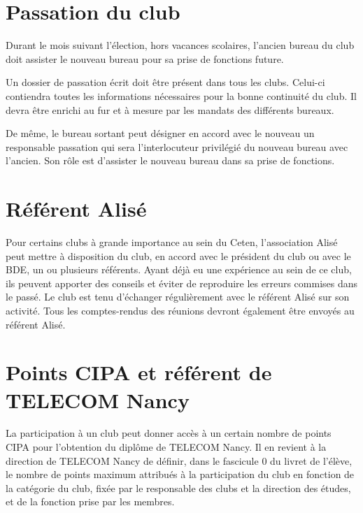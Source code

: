 \documentclass{article}
\begin{document}
\begin{multicols}{2}
		\section{Passation du club}
\label{sec:passation_du_club}

		{\small

			Durant le mois suivant l’élection, hors vacances scolaires, l’ancien
			bureau du club doit assister le nouveau bureau pour sa prise de
			fonctions future.

			Un dossier de passation écrit doit être présent dans tous les clubs.
			Celui-ci contiendra toutes les informations nécessaires pour la
			bonne continuité du club. Il devra être enrichi au fur et à mesure
			par les mandats des différents bureaux.

			De même, le bureau sortant peut désigner en accord avec le nouveau
			un responsable passation qui sera l’interlocuteur privilégié du
			nouveau bureau avec l’ancien. Son rôle est d’assister le nouveau
			bureau dans sa prise de fonctions.

		}

		\section{Référent Alisé}
\label{sec:referent_alise}

		{\small

			Pour certains clubs à grande importance au sein du Ceten,
			l’association Alisé peut mettre à disposition du club, en accord
			avec le président du club ou avec le BDE, un ou plusieurs référents.
			Ayant déjà eu une expérience au sein de ce club, ils peuvent
			apporter des conseils et éviter de reproduire les erreurs commises
			dans le passé. Le club est tenu d’échanger régulièrement avec le
			référent Alisé sur son activité. Tous les comptes-rendus des
			réunions devront également être envoyés au référent Alisé\@.

		}
		
		\section{Points CIPA et référent de TELECOM Nancy}
\label{sec:points_cipa_et_referent_de_telecom_nancy}

		{\small

			La participation à un club peut donner accès à un certain nombre de
			points CIPA pour l’obtention du diplôme de TELECOM Nancy. Il en
			revient à la direction de TELECOM Nancy de définir, dans le
			fascicule 0 du livret de l'élève, le nombre de points maximum
			attribués à la participation du club en fonction de la catégorie du
			club, fixée par le responsable des clubs et la direction des études,
			et de la fonction prise par les membres.

}
\end{multicols}
\end{document}
